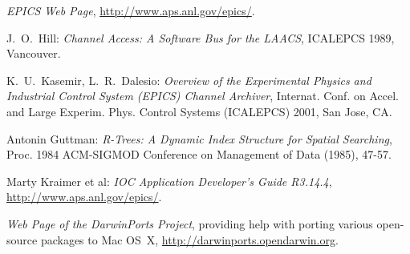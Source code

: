 
\begin{thebibliography}{99}

\emph{EPICS Web Page},
\href{http://www.aps.anl.gov/epics/}{http://www.aps.anl.gov/epics/}.

J.~O.~Hill:
\emph{Channel Access: A Software Bus for the LAACS},
ICALEPCS 1989, Vancouver.

K.~U.~Kasemir, L.~R.~Dalesio:
\emph{Overview of the Experimental Physics and Industrial Control System (EPICS) Channel Archiver},
Internat. Conf. on Accel. and Large Experim. Phys. Control Systems (ICALEPCS) 2001, San Jose, CA.

Antonin Guttman:
\emph{R-Trees: A Dynamic Index Structure for Spatial Searching},
Proc. 1984 ACM-SIGMOD Conference on Management of Data (1985), 47-57.

Marty Kraimer et al:
\emph{IOC Application Developer's Guide R3.14.4},
\href{http://www.aps.anl.gov/epics/}{http://www.aps.anl.gov/epics/}.

\emph{Web Page of the DarwinPorts Project},
providing help with porting various open-source packages
to Mac OS~X,
\href{http://darwinports.opendarwin.org}{http://darwinports.opendarwin.org}.

\end{thebibliography}
